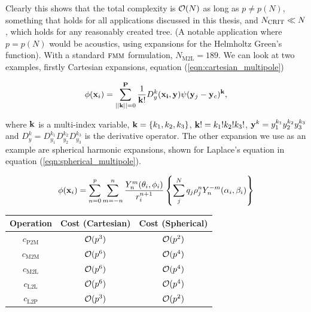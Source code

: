 Clearly this shows that the total complexity is $\mathcal{O}(N)$ as long as $p \not= p(N)$, something that holds for all applications discussed in this thesis, and $N_{\text{CRIT}} \ll N$, which holds for any reasonably created tree. (A notable application where $p = p(N)$ would be acoustics, using expansions for the Helmholtz Green's function). With a standard $\textsc{fmm}$ formulation, $N_{\text{M2L}} = 189$. We can look at two examples, firstly Cartesian expansions, equation (\ref{eqn:cartesian_multipole})

\begin{equation}
	\phi(\vect{x}_i) = \sum_{||\vect{k}||=0}^{\vect{P}}\frac{1}{\vect{k}!}D^{k}_y(\vect{x_i},\vect{y})\psi(\vect{y}_j-\vect{y}_c)^{\vect{k}},
	\label{eqn:cartesian_multipole}
\end{equation}

where $\mathbf{k}$ is a multi-index variable, $\mathbf{k}=\{k_1, k_2, k_3\}$, $\mathbf{k}! = k_1!k_2!k_3!$, $\mathbf{y}^{k} = y_1^{k_1}y_2^{k_2}y_3^{k_3}$ and $D_y^{k} = D^{k_1}_{y_1}D^{k_2}_{y_2}D^{k_3}_{y_3}$ is the derivative operator. The other expansion we use as an example are spherical harmonic expansions, shown for Laplace's equation in equation (\ref{eqn:spherical_multipole}).

\begin{equation}
\phi(\vect{x}_i) = \sum_{n=0}^{p}\sum_{m=-n}^{n}\frac{Y^{m}_n(\theta_i,\phi_i)}{r_i^{n+1}}\left \{\sum_j^{N}q_j\rho^{n}_jY^{-m}_n(\alpha_i,\beta_i)\right \}
	\label{eqn:spherical_multipole}
\end{equation}

\begin{center}
	\begin{tabular}{c|c|c}
		Operation & Cost (Cartesian) & Cost (Spherical) \\ \hline
		$c_{\text{P2M}}$ & $\mathcal{O}(p^{3})$ & $\mathcal{O}(p^{2})$ \\
		$c_{\text{M2M}}$ & $\mathcal{O}(p^{6})$ & $\mathcal{O}(p^{4})$ \\
		$c_{\text{M2L}}$ & $\mathcal{O}(p^{6})$ & $\mathcal{O}(p^{4})$ \\
		$c_{\text{L2L}}$ & $\mathcal{O}(p^{6})$ & $\mathcal{O}(p^{4})$ \\
		$c_{\text{L2P}}$ & $\mathcal{O}(p^{3})$ & $\mathcal{O}(p^{2})$
	\end{tabular}
\end{center}

